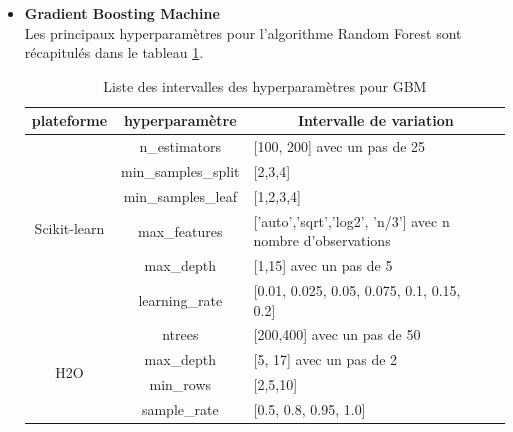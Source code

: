 \begin{itemize}
        \item[\ding{233}]\textbf{Gradient Boosting Machine}\\%
Les principaux hyperparamètres pour l'algorithme Random Forest sont récapitulés dans le tableau \ref{tab:HP-GBM-OP}.
        \begin{table}[h!]
        \centering
        \begin{tabular}{|c|c|p{7cm}p{0.2cm}|}
        \hline
       plateforme & hyperparamètre &\multicolumn{2}{|c|}{Intervalle de variation} \\ \hline
        \multirow{6}{*}{Scikit-learn} 
        & n\_estimators & [100, 200] avec un pas de 25 &\\
        & min\_samples\_split & [2,3,4]  &\\ 
        & min\_samples\_leaf & [1,2,3,4] &\\
        & max\_features & ['auto','sqrt','log2', 'n/3'] avec n nombre d'observations &\\
        & max\_depth & [1,15] avec un pas de 5 &\\
        & learning\_rate  & [0.01, 0.025, 0.05, 0.075, 0.1, 0.15, 0.2] &\\
         \hline
        \multirow{4}{*}{H2O} 
        & ntrees & [200,400] avec un pas de 50 &\\
        & max\_depth & [5, 17] avec un pas de 2 &\\
        & min\_rows & [2,5,10] &\\ 
        & sample\_rate & [0.5, 0.8, 0.95, 1.0] &\\
         \hline
        \end{tabular}
        \caption{Liste des intervalles des hyperparamètres pour GBM}
        \label{tab:HP-GBM-OP}
        \end{table}
 

\end{itemize}
